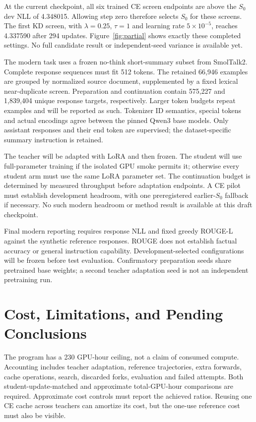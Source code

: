 \documentclass[11pt]{article}
\begin{document}
At the current checkpoint, all six trained CE screen endpoints are above
the $S_0$ dev NLL of 4.348015. Allowing step zero therefore selects $S_0$
for these screens. The first KD screen, with $\lambda=0.25$, $\tau=1$
and learning rate $5\times10^{-5}$, reaches 4.337590 after 294 updates.
Figure~\ref{fig:partial} shows exactly these completed settings. No full
candidate result or independent-seed variance is available yet.

The modern task uses a frozen no-think short-summary subset from
SmolTalk2. Complete response sequences must fit 512 tokens. The retained
66,946 examples are grouped by normalized source document, supplemented
by a fixed lexical near-duplicate screen. Preparation and continuation
contain 575,227 and 1,839,404 unique response targets, respectively.
Larger token budgets repeat examples and will be reported as such.
Tokenizer ID semantics, special tokens and actual encodings agree between
the pinned Qwen3 base models. Only assistant responses and their end
token are supervised; the dataset-specific summary instruction is retained.

The teacher will be adapted with LoRA and then frozen. The student will
use full-parameter training if the isolated GPU smoke permits it;
otherwise every student arm must use the same LoRA parameter set.
The continuation budget is determined by measured throughput before
adaptation endpoints. A CE pilot must establish development headroom,
with one preregistered earlier-$S_0$ fallback if necessary. No such modern
headroom or method result is available at this draft checkpoint.

Final modern reporting requires response NLL and fixed greedy ROUGE-L
against the synthetic reference responses. ROUGE does not establish
factual accuracy or general instruction capability. Development-selected
configurations will be frozen before test evaluation. Confirmatory
preparation seeds share pretrained base weights; a second teacher
adaptation seed is not an independent pretraining run.

\section{Cost, Limitations, and Pending Conclusions}
The program has a 230 GPU-hour ceiling, not a claim of consumed compute.
Accounting includes teacher adaptation, reference trajectories, extra
forwards, cache operations, search, discarded forks, evaluation and failed
attempts. Both student-update-matched and approximate total-GPU-hour
comparisons are required. Approximate cost controls must report the
achieved ratios. Reusing one CE cache across teachers can amortize its
cost, but the one-use reference cost must also be visible.
\end{document}
